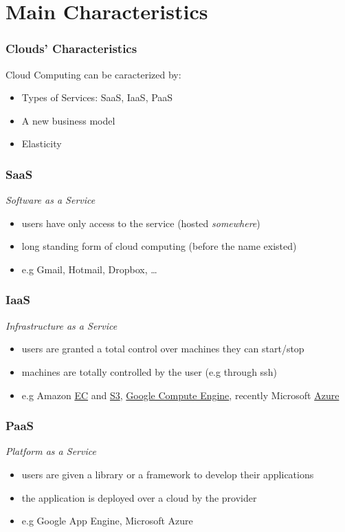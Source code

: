 \documentclass[bigger,hyperref={colorlinks=true, urlcolor=red, plainpages=false, pdfpagelabels, bookmarksnumbered}]{beamer}
\begin{document}
\section{Main Characteristics}
\label{sec-2}
\begin{frame}
\frametitle{Clouds' Characteristics}
\label{sec-2-1}

Cloud Computing can be caracterized by:
\begin{itemize}
\item Types of Services: SaaS, IaaS, PaaS
\item A new business model
\item Elasticity
\end{itemize}
\end{frame}
\begin{frame}
\frametitle{SaaS}
\label{sec-2-2}

\emph{Software as a Service} 
\begin{itemize}
\item users have only access to the service (hosted \emph{somewhere})
\item long standing form of cloud computing (before the name existed)
\item e.g Gmail, Hotmail, Dropbox, \ldots{}
\end{itemize}
\end{frame}
\begin{frame}
\frametitle{IaaS}
\label{sec-2-3}

\emph{Infrastructure as a Service}
\begin{itemize}
\item users are granted a total control over machines they can start/stop
\item machines are totally controlled by the user (e.g through ssh)
\item e.g Amazon \href{http://aws.amazon.com/ec2}{EC} and \href{http://aws.amazon.com/s3}{S3}, \href{http://https://cloud.google.com/products/compute-engine/}{Google Compute Engine}, recently Microsoft \href{http://http://azure.microsoft.com}{Azure}
\end{itemize}
\end{frame}
\begin{frame}
\frametitle{PaaS}
\label{sec-2-4}

\emph{Platform as a Service}
\begin{itemize}
\item users are given a library or a framework to develop their applications
\item the application is deployed over a cloud by the provider
\item e.g Google App Engine, Microsoft Azure
\end{itemize}
\end{frame}
\end{document}
